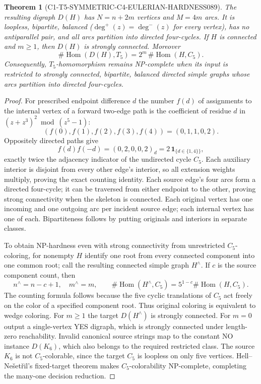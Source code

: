 \documentclass[11pt]{article}
\newtheorem{theorem}{Theorem}
\begin{document}
\begin{theorem}[C1-T5-SYMMETRIC-C4-EULERIAN-HARDNESS089]
The resulting digraph $D(H)$ has $N=n+2m$ vertices and $M=4m$
arcs. It is loopless, bipartite, balanced
($\deg^+(z)=\deg^-(z)$ for every vertex), has no antiparallel pair,
and all arcs partition into directed four-cycles. If $H$ is
connected and $m\ge1$, then $D(H)$ is strongly connected.
Moreover
\[
\boxed{\#\operatorname{Hom}(D(H),T_5)
=2^m\,\#\operatorname{Hom}(H,C_5).}
\]
Consequently, $T_5$-homomorphism remains NP-complete when its input
is restricted to strongly connected, bipartite, balanced directed
simple graphs whose arcs partition into directed four-cycles.
\end{theorem}
\begin{proof}
For prescribed endpoint difference $d$ the number $f(d)$ of
assignments to the internal vertex of a forward two-edge path
is the coefficient of residue $d$ in $(z+z^3)^2\bmod(z^5-1)$:
\[
(f(0),f(1),f(2),f(3),f(4))=(0,1,1,0,2).
\]
Oppositely directed paths give
\[
f(d)f(-d)=(0,2,0,0,2)_d
=2\,\mathbf 1_{\{d\in\{1,4\}\}},
\]
exactly twice the adjacency indicator of the undirected cycle
$C_5$. Each auxiliary interior is disjoint from every other
edge's interior, so all extension weights multiply, proving
the exact counting identity. Each source edge's four arcs form
a directed four-cycle; it can be traversed from either endpoint
to the other, proving strong connectivity when the skeleton
is connected. Each original vertex has one incoming and one
outgoing arc per incident source edge; each internal vertex
has one of each. Bipartiteness follows by putting originals
and interiors in separate classes.

To obtain NP-hardness even with strong connectivity from
unrestricted $C_5$-coloring, for nonempty $H$ identify one
root from every connected component into one common root;
call the resulting connected simple graph $H^\wedge$.
If $c$ is the source component count, then
\[
n^\wedge=n-c+1,\quad m^\wedge=m,\qquad
\#\operatorname{Hom}(H^\wedge,C_5)
=5^{1-c}\#\operatorname{Hom}(H,C_5).
\]
The counting formula follows because the five cyclic
translations of $C_5$ act freely on the color of a
specified component root. Thus original coloring is
equivalent to wedge coloring. For $m\ge1$ the target
$D(H^\wedge)$ is strongly connected. For $m=0$ output a
single-vertex YES digraph, which is strongly connected
under length-zero reachability. Invalid canonical source
strings map to the constant NO instance $D(K_6)$,
which also belongs to the required restricted class.
The source $K_6$ is not $C_5$-colorable, since the
target $C_5$ is loopless on only five vertices.
Hell--Ne\v{s}et\v{r}il's fixed-target theorem
makes $C_5$-colorability NP-complete, completing the
many-one decision reduction.
\end{proof}
\end{document}
